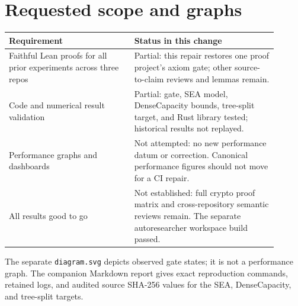 \documentclass[10pt]{article}
\newcommand{\mono}[1]{\texttt{#1}}
\begin{document}
\section*{Requested scope and graphs}
\begin{tabular}{|p{0.42\linewidth}|p{0.48\linewidth}|}\hline
Requirement & Status in this change \\ \hline
Faithful Lean proofs for all prior experiments across three repos & Partial: this repair restores one proof project's axiom gate; other source-to-claim reviews and lemmas remain. \\ \hline
Code and numerical result validation & Partial: gate, SEA model, DenseCapacity bounds, tree-split target, and Rust library tested; historical results not replayed. \\ \hline
Performance graphs and dashboards & Not attempted: no new performance datum or correction. Canonical performance figures should not move for a CI repair. \\ \hline
All results good to go & Not established: full crypto proof matrix and cross-repository semantic reviews remain. The separate autoresearcher workspace build passed. \\ \hline
\end{tabular}

The separate \mono{diagram.svg} depicts observed gate states; it is not a
performance graph. The companion Markdown report gives exact reproduction
commands, retained logs, and audited source SHA-256 values for the SEA,
DenseCapacity, and tree-split targets.
\end{document}

